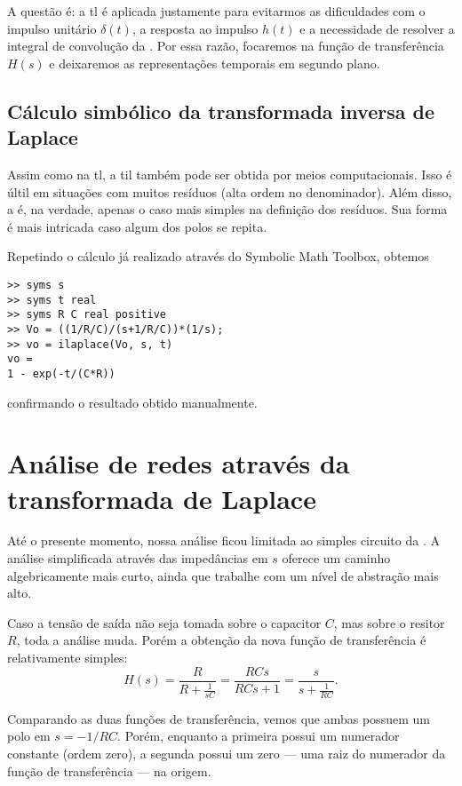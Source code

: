 A questão é: a \ac{tl} é aplicada justamente para evitarmos as dificuldades com o impulso unitário $\delta(t)$, a resposta ao impulso $h(t)$ e a necessidade de resolver a integral de convolução da . Por essa razão, focaremos na função de transferência $H(s)$ e deixaremos as representações temporais em segundo plano.

\subsection{Cálculo simbólico da transformada inversa de Laplace}

Assim como na \ac{tl}, a \ac{til} também pode ser obtida por meios computacionais. Isso é últil em situações com muitos resíduos (alta ordem no denominador). Além disso, a  é, na verdade, apenas o caso mais simples na definição dos resíduos. Sua forma é mais intricada caso algum dos polos se repita.

Repetindo o cálculo já realizado através do Symbolic Math Toolbox, obtemos
\begin{lstlisting}
>> syms s
>> syms t real
>> syms R C real positive
>> Vo = ((1/R/C)/(s+1/R/C))*(1/s);
>> vo = ilaplace(Vo, s, t)
vo =
1 - exp(-t/(C*R))
\end{lstlisting}
confirmando o resultado obtido manualmente.

\section{Análise de redes através da transformada de Laplace}

Até o presente momento, nossa análise ficou limitada ao simples circuito da . A análise simplificada através das impedâncias em $s$ oferece um caminho algebricamente mais curto, ainda que trabalhe com um nível de abstração mais alto.

Caso a tensão de saída não seja tomada sobre o capacitor $C$, mas sobre o resitor $R$, toda a análise muda. Porém a obtenção da nova função de transferência é relativamente simples:
\begin{equation*}
	H(s)=\frac{R}{R+\frac{1}{sC}}=\frac{RCs}{RCs+1}=\frac{s}{s+\frac{1}{RC}}.
\end{equation*}

Comparando as duas funções de transferência, vemos que ambas possuem um polo em $s=-1\slash RC$. Porém, enquanto a primeira possui um numerador constante (ordem zero), a segunda possui um zero --- uma raiz do numerador da função de transferência --- na origem.

